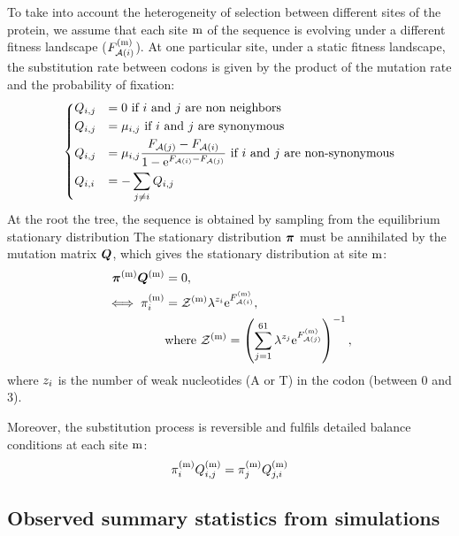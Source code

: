 To take into account the heterogeneity of selection between different sites of the protein, we assume that each site $\text{m}$ of the sequence is evolving under a different fitness landscape ($F_{\mathcal{A}({i})}^{(\text{m})}$).
At one particular site, under a static fitness landscape, the substitution rate between codons is given by the product of the mutation rate and the probability of fixation:
\begin{equation}
    \begin{dcases}
        Q_{{i}, {j}} & = 0 \text{ if ${i}$ and ${j}$ are non neighbors} \\
        Q_{{i}, {j}} & = \mu_{{i}, {j}} \text{ if ${i}$ and ${j}$ are synonymous} \\
        Q_{{i}, {j}} & = \mu_{{i}, {j}} \dfrac{F_{\mathcal{A}({j})} - F_{\mathcal{A}({i})}}{1 - \mathrm{e}^{F_{\mathcal{A}({i})} - F_{\mathcal{A}({j})}} } \text{ if ${i}$ and ${j}$ are non-synonymous} \\
        Q_{{i}, {i}} & = - \sum\limits_{{j} \neq {i}} Q_{{i}, {j}}
    \end{dcases}
    \label{codonSubRates}
\end{equation}
At the root the tree, the sequence is obtained by sampling from the equilibrium stationary distribution
The stationary distribution $\bm{\pi}$ must be annihilated by the mutation matrix $\bm{Q}$, which gives the stationary distribution at site $\text{m}$:
\begin{align}
    \bm{\pi}^{(\text{m})} \bm{Q}^{(\text{m})}
    & = 0 ,\\
    \iff \pi_{{i}}^{(\text{m})}
    & = \mathcal{Z}^{(\text{m})} \lambda^{{z}_{{i}}} \mathrm{e}^{F_{\mathcal{A}({i})}^{(\text{m})}},\\
    & \mathrm{ where } \ \mathcal{Z}^{(\text{m})} = \left( \sum\limits_{{j}=1}^{61} \lambda^{{z}_{{j}}} \mathrm{e}^{F_{\mathcal{A}({j})}^{(\text{m})}} \right)^{-1},
    \label{codonStationarity}
\end{align}
where ${z}_{{i}}$ is the number of weak nucleotides (A or T) in the codon (between 0 and 3).

Moreover, the substitution process is reversible and fulfils detailed balance conditions at each site $\text{m}$:
\begin{align}
    \pi_{{i}}^{(\text{m})} Q_{{i}, {j}}^{(\text{m})} = \pi_{{j}}^{(\text{m})} Q_{{j}, {i}}^{(\text{m})}
    \label{codonSubBalance}
\end{align}

\subsection{Observed summary statistics from simulations}
\label{subsec:summary-statistics}

